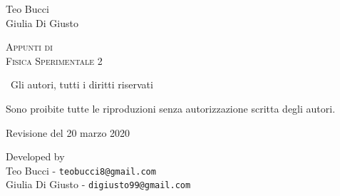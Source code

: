 \documentclass[10pt,a4paper]{book}
\numberwithin{equation}{subsection}
\begin{document}





\pagestyle{empty} %
\vspace*{\fill}
Teo Bucci \\
Giulia Di Giusto \\

\begin{center}
	{\large \textsc{Appunti di}}\\
	\vspace*{0.4cm}
	{\Huge \textsc{Fisica Sperimentale 2}}

\end{center}
\vspace*{\fill}
\newpage




\vspace*{\fill}

\textcopyright \ Gli autori, tutti i diritti riservati

Sono proibite tutte le riproduzioni senza autorizzazione scritta degli autori.

Revisione del 20 marzo 2020%

Developed by\\
Teo Bucci - \texttt{teobucci8@gmail.com}\\
Giulia Di Giusto - \texttt{digiusto99@gmail.com}
\end{document}
